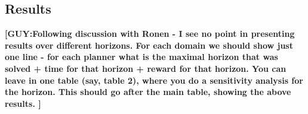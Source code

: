 \documentclass[letterpaper]{article} %
\theoremstyle{definition}
\newcommand{\guy}[1]{\textbf{[\color{orange}GUY:#1]}}
\begin{document}
\subsection{Results}


\guy{Following discussion with Ronen - I see no point in presenting results over different horizons. For each domain we should show just one line - for each planner what is the maximal horizon that was solved + time for that horizon + reward for that horizon.
You can leave in one table (say, table 2), where you do a sensitivity analysis for the horizon. This should go after the main table, showing the above results.
}

\begin{table}
\centering
\scriptsize
    \caption{\label{tbl:small} Results for BP-21210. FDMAP outputs a reasonable value compared to GMAA-ICE, which most likely optimizes the small scaled problem.}
\end{table}
\end{document}
